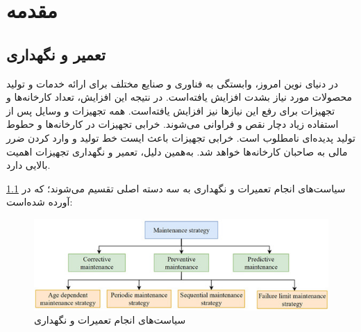 \chapter{مقدمه}

\section{تعمیر و نگهداری}

در دنیای نوین امروز، وابستگی به فناوری و صنایع مختلف برای ارائه خدمات و تولید محصولات مورد نیاز بشدت افزایش یافته‌است. در نتیجه این افزایش، تعداد کارخانه‌ها و تجهیزات برای رفع این نیازها نیز افزایش یافته‌است. همه تجهیزات و وسایل پس از استفاده زیاد دچار نقص و فراوانی می‌شوند. خرابی تجهیزات در کارخانه‌ها و حطوط تولید پدیده‌ای نامطلوب است. خرابی تجهیزات باعث ایست خط تولید و وارد کردن ضرر مالی به صاحبان کارخانه‌ها خواهد شد. به‌همین دلیل، تعمیر و نگهداری تجهیزات اهمیت بالایی دارد. 

سیاست‌های انجام تعمیرات و نگهداری به سه دسته اصلی تقسیم می‌شوند؛ که در \cref{MS} \cite{zhao2022review} آورده شده‌است:

\begin{figure}[!h]
\centering\includegraphics[scale=1]{maintenance_strategy.png}
\caption{سیاست‌های انجام تعمیرات و نگهداری \cite{zhao2022review}}\label{MS}
\end{figure}

